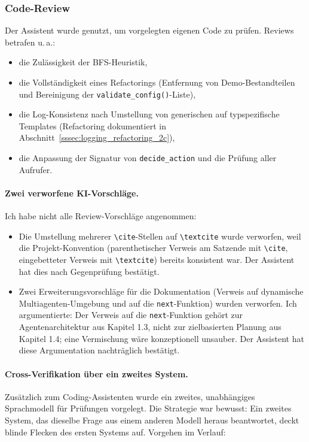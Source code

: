 \subsubsection{Code-Review}

Der Assistent wurde genutzt, um vorgelegten eigenen Code zu prüfen. Reviews betrafen u.\,a.:

\begin{itemize}
    \item die Zulässigkeit der \acs{BFS}-Heuristik,
    \item die Vollständigkeit eines Refactorings (Entfernung von Demo-Bestandteilen und Bereinigung der \texttt{validate\_config()}-Liste),
    \item die Log-Konsistenz nach Umstellung von generischen auf typspezifische Templates (Refactoring dokumentiert in Abschnitt~\ref{sssec:logging_refactoring_2c}),
    \item die Anpassung der Signatur von \texttt{decide\_action} und die Prüfung aller Aufrufer.
\end{itemize}

\paragraph{Zwei verworfene KI-Vorschläge.}
Ich habe nicht alle Review-Vorschläge angenommen:
\begin{itemize}
    \item Die Umstellung mehrerer \texttt{\textbackslash cite}-Stellen auf \texttt{\textbackslash textcite} wurde verworfen, weil die Projekt-Konvention (parenthetischer Verweis am Satzende mit \texttt{\textbackslash cite}, eingebetteter Verweis mit \texttt{\textbackslash textcite}) bereits konsistent war. Der Assistent hat dies nach Gegenprüfung bestätigt.
    \item Zwei Erweiterungsvorschläge für die Dokumentation (Verweis auf dynamische Multiagenten-Umgebung und auf die \texttt{next}-Funktion) wurden verworfen. Ich argumentierte: Der Verweis auf die \texttt{next}-Funktion gehört zur Agentenarchitektur aus Kapitel 1.3, nicht zur zielbasierten Planung aus Kapitel 1.4; eine Vermischung wäre konzeptionell unsauber. Der Assistent hat diese Argumentation nachträglich bestätigt.
\end{itemize}

\paragraph{Cross-Verifikation über ein zweites System.}
Zusätzlich zum Coding-Assistenten wurde ein zweites, unabhängiges Sprachmodell für Prüfungen vorgelegt. Die Strategie war bewusst: Ein zweites System, das dieselbe Frage aus einem anderen Modell heraus beantwortet, deckt blinde Flecken des ersten Systems auf. Vorgehen im Verlauf:

